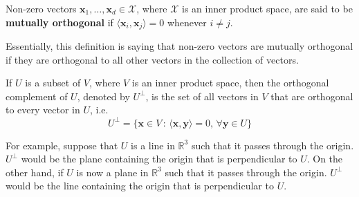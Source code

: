 \documentclass[12pt]{article}
\begin{document}
\begin{definition}
Non-zero vectors $\mathbf{x}_1,\ldots,\mathbf{x}_d\in\mathcal{X}$, where $\mathcal{X}$ is an inner product space, are said to be \textbf{mutually orthogonal} if $\langle \mathbf{x}_i, \mathbf{x}_j\rangle = 0$ whenever $i\neq j$. 
\end{definition}
\noindent Essentially, this definition is saying that non-zero vectors are mutually orthogonal if they are orthogonal to all other vectors in the collection of vectors.
\begin{definition}
If $U$ is a subset of $V$, where $V$ is an inner product space, then the orthogonal complement of $U$, denoted by $U^\perp$, is the set of all vectors in $V$ that are orthogonal to every vector in $U$, i.e. $$U^\perp = \{\mathbf{x}\in V\,:\, \langle \mathbf{x},\mathbf{y}\rangle = 0,\,\forall \mathbf{y}\in U\}$$
\end{definition}

\noindent For example, suppose that $U$ is a line in $\mathbb{R}^3$ such that it passes through the origin. $U^\perp$ would be the plane containing the origin that is perpendicular to $U$. On the other hand, if $U$ is now a plane in $\mathbb{R}^3$ such that it passes through the origin. $U^\perp$ would be the line containing the origin that is perpendicular to $U$.
\end{document}
